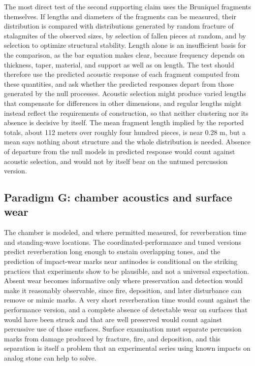 \documentclass[12pt]{article}
\begin{document}
The most direct test of the second supporting claim uses the Bruniquel fragments themselves. If lengths and diameters of the fragments can be measured, their distribution is compared with distributions generated by random fracture of stalagmites of the observed sizes, by selection of fallen pieces at random, and by selection to optimize structural stability. Length alone is an insufficient basis for the comparison, as the bar equation makes clear, because frequency depends on thickness, taper, material, and support as well as on length. The test should therefore use the predicted acoustic response of each fragment computed from these quantities, and ask whether the predicted responses depart from those generated by the null processes. Acoustic selection might produce varied lengths that compensate for differences in other dimensions, and regular lengths might instead reflect the requirements of construction, so that neither clustering nor its absence is decisive by itself. The mean fragment length implied by the reported totals, about 112 meters over roughly four hundred pieces, is near 0.28 m, but a mean says nothing about structure and the whole distribution is needed. Absence of departure from the null models in predicted response would count against acoustic selection, and would not by itself bear on the untuned percussion version.

\subsection*{Paradigm G: chamber acoustics and surface wear}

The chamber is modeled, and where permitted measured, for reverberation time and standing-wave locations. The coordinated-performance and tuned versions predict reverberation long enough to sustain overlapping tones, and the prediction of impact-wear marks near antinodes is conditional on the striking practices that experiments show to be plausible, and not a universal expectation. Absent wear becomes informative only where preservation and detection would make it reasonably observable, since fire, deposition, and later disturbance can remove or mimic marks. A very short reverberation time would count against the performance version, and a complete absence of detectable wear on surfaces that would have been struck and that are well preserved would count against percussive use of those surfaces. Surface examination must separate percussion marks from damage produced by fracture, fire, and deposition, and this separation is itself a problem that an experimental series using known impacts on analog stone can help to solve.
\end{document}
